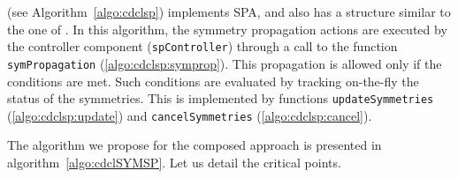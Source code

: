 {\cdclsp} (see Algorithm~\ref{algo:cdclsp}) implements SPA, and also has a
structure similar to the one of {\cdcl}. In this algorithm, the symmetry
propagation actions are executed by the controller component (\texttt{spController})
through a call to the function \texttt{symPropagation} (\cref{algo:cdclsp:symprop}). This
propagation is allowed only if the conditions %
are met. Such conditions are evaluated by tracking on-the-fly the status of the
symmetries. This is implemented by functions \texttt{updateSymmetries} (\cref{algo:cdclsp:update})
and \texttt{cancelSymmetries} (\cref{algo:cdclsp:cancel}).
 
The algorithm we propose for the composed approach is presented in
algorithm~\ref{algo:cdclSYMSP}. 
Let us detail the critical points.
